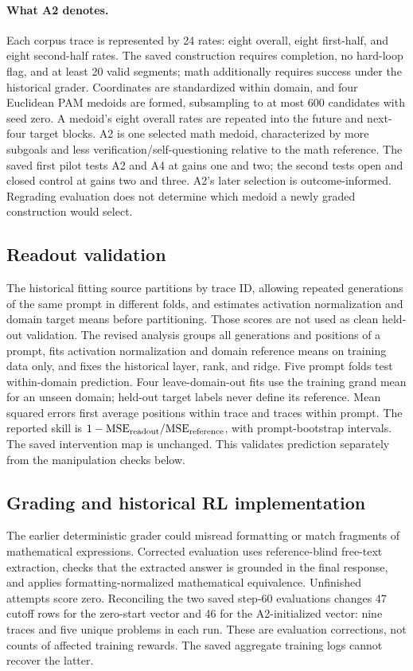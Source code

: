 \paragraph{What A2 denotes.}
Each corpus trace is represented by 24 rates: eight overall, eight first-half, and eight second-half rates. The saved construction requires completion, no hard-loop flag, and at least 20 valid segments; math additionally requires success under the historical grader. Coordinates are standardized within domain, and four Euclidean PAM medoids are formed, subsampling to at most 600 candidates with seed zero. A medoid's eight overall rates are repeated into the future and next-four target blocks. A2 is one selected math medoid, characterized by more subgoals and less verification/self-questioning relative to the math reference. The saved first pilot tests A2 and A4 at gains one and two; the second tests open and closed control at gains two and three. A2's later selection is outcome-informed. Regrading evaluation does not determine which medoid a newly graded construction would select.

\subsection{Readout validation}
The historical fitting source partitions by trace ID, allowing repeated generations of the same prompt in different folds, and estimates activation normalization and domain target means before partitioning. Those scores are not used as clean held-out validation. The revised analysis groups all generations and positions of a prompt, fits activation normalization and domain reference means on training data only, and fixes the historical layer, rank, and ridge. Five prompt folds test within-domain prediction. Four leave-domain-out fits use the training grand mean for an unseen domain; held-out target labels never define its reference. Mean squared errors first average positions within trace and traces within prompt. The reported skill is $1-\mathrm{MSE}_{\rm readout}/\mathrm{MSE}_{\rm reference}$, with prompt-bootstrap intervals. The saved intervention map is unchanged. This validates prediction separately from the manipulation checks below.

\subsection{Grading and historical RL implementation}
The earlier deterministic grader could misread formatting or match fragments of mathematical expressions. Corrected evaluation uses reference-blind free-text extraction, checks that the extracted answer is grounded in the final response, and applies formatting-normalized mathematical equivalence. Unfinished attempts score zero. Reconciling the two saved step-60 evaluations changes 47 cutoff rows for the zero-start vector and 46 for the A2-initialized vector: nine traces and five unique problems in each run. These are evaluation corrections, not counts of affected training rewards. The saved aggregate training logs cannot recover the latter.

